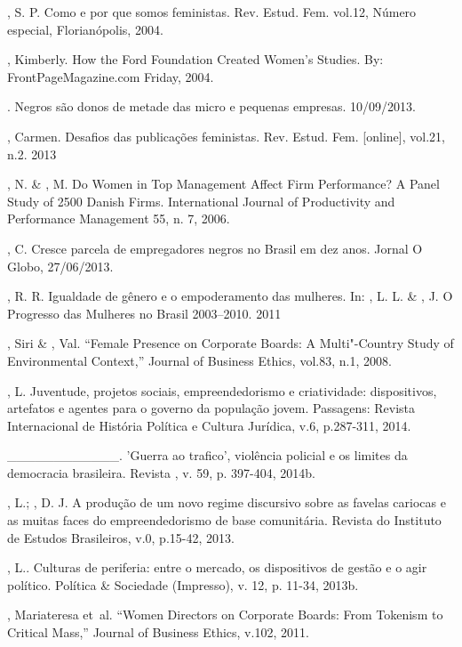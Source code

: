 \begin{Parskip}
, S. P. Como e por que somos feministas. Rev. Estud. Fem. vol.12,
Número especial, Florianópolis, 2004.

, Kimberly. How the Ford Foundation Created Women's Studies. By:
FrontPageMagazine.com \textbar{} Friday, 2004.

. Negros são donos de metade das micro e pequenas empresas.
10/09/2013.

, Carmen. Desafios das publicações feministas. Rev. Estud. Fem.
{[}online{]}, vol.21, n.2. 2013

, N. \& , M. Do Women in Top Management Affect Firm
Performance? A Panel Study of 2500 Danish Firms. International Journal
of Productivity and Performance Management 55, n. 7, 2006.

, C. Cresce parcela de empregadores negros no Brasil em dez anos.
Jornal O Globo, 27/06/2013.

, R. R. Igualdade de gênero e o empoderamento das mulheres. In:
, L. L. \& , J. O Progresso das Mulheres no Brasil
2003--2010. 2011

, Siri \& , Val. ``Female Presence on Corporate Boards: A
Multi"-Country Study of Environmental Context,'' Journal of Business
Ethics, vol.83, n.1, 2008.

, L. Juventude, projetos sociais, empreendedorismo e
criatividade: dispositivos, artefatos e agentes para o governo da
população jovem. Passagens: Revista Internacional de História Política e
Cultura Jurídica, v.6, p.287-311, 2014.

\_\_\_\_\_\_\_\_\_\_\_\_. 'Guerra ao trafico', violência policial e os
limites da democracia brasileira. Revista , v. 59, p. 397-404, 2014b.

, L.; , D. J. A produção de um novo regime discursivo
sobre as favelas cariocas e as muitas faces do empreendedorismo de base
comunitária. Revista do Instituto de Estudos Brasileiros, v.0, p.15-42,
2013.

, L.. Culturas de periferia: entre o mercado, os dispositivos de
gestão e o agir político. Política \& Sociedade (Impresso), v. 12, p.
11-34, 2013b.

, Mariateresa et~al. ``Women Directors on Corporate Boards: From
Tokenism to Critical Mass,'' Journal of Business Ethics, v.102, 2011.


\end{Parskip}
